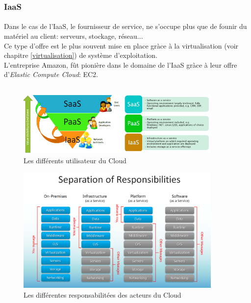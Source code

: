 \subsubsection{IaaS}
\paragraph*{}
Dans le cas de l'IaaS, le fournisseur de service, ne s'occupe plus que de founir du matériel au client: serveurs, stockage, réseau...
\\
Ce type d'offre est le plus souvent mise en place gràce à la virtualisation (voir chapitre \ref{virtualisation}) de système d'exploitation.
\\
L'entreprise Amazon, fût pionière dans le domaine de l'IaaS gràce à leur offre d'\textsl{Elastic Compute Cloud}: EC2.

\subsection*{} %

\begin{figure}[h]
\centering
\includegraphics[width=0.9\textwidth]{resource/img/clouds-users}
\caption{Les différents utilisateur du Cloud}
\end{figure}

\begin{figure}[h]
\centering
\includegraphics[width=0.9\textwidth]{resource/img/clouds-responsabilities}
\caption{Les différentes responsabilitées des acteurs du Cloud}
\end{figure}

